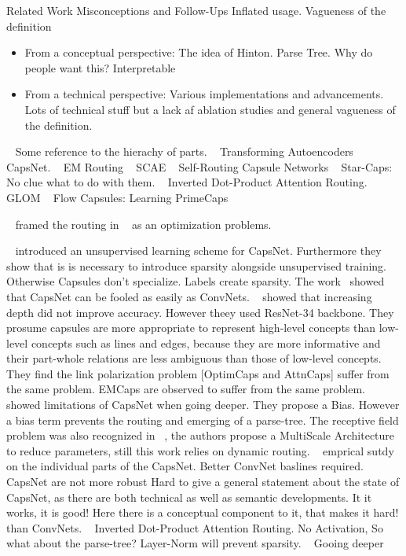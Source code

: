 \documentclass{article}
\begin{document}
Related Work
Misconceptions and Follow-Ups
Inflated usage.
Vagueness of the definition
\begin{itemize}
	\item From a conceptual perspective: The idea of Hinton. Parse Tree. Why do people want this? Interpretable
	\item From a technical perspective: Various implementations and advancements. Lots of technical stuff but a lack af ablation studies and general vagueness of the definition.
\end{itemize}


~\cite{cogsci/Hinton79} Some reference to the hierachy of parts.
~\cite{icann/HintonKW11} Transforming Autoencoders
~\cite{nips/SabourFH17} CapsNet.
~\cite{iclr/HintonSF18} EM Routing
~\cite{nips/KosiorekSTH19} SCAE
~\cite{nips/HahnPK19} Self-Routing Capsule Networks
~\cite{nips/AhmedT19} Star-Caps: No clue what to do with them.
~\cite{iclr/TsaiSGS20} Inverted Dot-Product Attention Routing.
~\cite{corr/Hinton2021} GLOM
~\cite{icml/SabourTYHF21} Flow Capsules: Learning PrimeCaps


~\cite{iclr/Wang018} framed the routing in ~\cite{nips/SabourFH17} as an optimization problems.

~\cite{corr/Rawlinson2018} introduced an unsupervised learning scheme for CapsNet. Furthermore they show that is is necessary to introduce sparsity alongside unsupervised training. Otherwise Capsules don't specialize. Labels create sparsity.
The work~\cite{corr/Michels19} showed that CapsNet can be fooled as easily as ConvNets.
~\cite{acml/PaikKK19} showed that increasing depth did not improve accuracy. However theey used ResNet-34 backbone. They prosume
capsules are more appropriate to represent high-level concepts than low-level concepts
such as lines and edges, because they are more informative and their part-whole
relations are less ambiguous than those of low-level concepts. They find the link polarization problem [OptimCaps and AttnCaps] suffer from the same problem. EMCaps are observed to suffer from the same problem.
~\cite{prl/PeerSR21} showed limitations of CapsNet when going deeper. They propose a Bias. However a bias term prevents the routing and emerging of a parse-tree.
The receptive field problem was also recognized in ~\cite{spl/XiangZTZX18}, the authors propose a MultiScale Architecture to reduce parameters, still this work relies on dynamic routing.
~\cite{cvpr/GuT021} emprical sutdy on the individual parts of the CapsNet. Better ConvNet baslines required. CapsNet are not more robust 
Hard to give a general statement about the state of CapsNet, as there are both technical as well as semantic developments.
It it works, it is good! Here there is a conceptual component to it, that makes it hard!
than ConvNets.
~\cite{iclr/TsaiSGS20} Inverted Dot-Product Attention Routing. No Activation, So what about the parse-tree? Layer-Norm will prevent sparsity.
~\cite{cvpr/RajasegaranJJJS19} Gooing deeper
\end{document}
